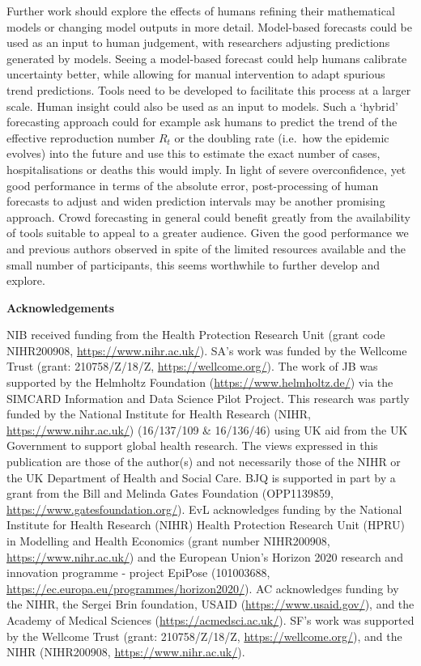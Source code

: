 \documentclass[
]{article}
\begin{document}
Further work should explore the effects of humans refining their mathematical models or changing model outputs in more detail. Model-based forecasts could be used as an input to human judgement, with researchers adjusting predictions generated by models. Seeing a model-based forecast could help humans calibrate uncertainty better, while allowing for manual intervention to adapt spurious trend predictions. Tools need to be developed to facilitate this process at a larger scale. Human insight could also be used as an input to models. Such a `hybrid' forecasting approach could for example ask humans to predict the trend of the effective reproduction number \(R_t\) or the doubling rate (i.e.~how the epidemic evolves) into the future and use this to estimate the exact number of cases, hospitalisations or deaths this would imply. In light of severe overconfidence, yet good performance in terms of the absolute error, post-processing of human forecasts to adjust and widen prediction intervals may be another promising approach. Crowd forecasting in general could benefit greatly from the availability of tools suitable to appeal to a greater audience. Given the good performance we and previous authors observed in spite of the limited resources available and the small number of participants, this seems worthwhile to further develop and explore.

\clearpage

\textbf{Acknowledgements}

NIB received funding from the Health Protection Research Unit (grant code NIHR200908, \url{https://www.nihr.ac.uk/}). SA's work was funded by the Wellcome Trust (grant: 210758/Z/18/Z, \url{https://wellcome.org/}). The work of JB was supported by the Helmholtz Foundation (\url{https://www.helmholtz.de/}) via the SIMCARD Information and Data Science Pilot Project. This research was partly funded by the National Institute for Health Research (NIHR, \url{https://www.nihr.ac.uk/}) (16/137/109 \& 16/136/46) using UK aid from the UK Government to support global health research. The views expressed in this publication are those of the author(s) and not necessarily those of the NIHR or the UK Department of Health and Social Care. BJQ is supported in part by a grant from the Bill and Melinda Gates Foundation (OPP1139859, \url{https://www.gatesfoundation.org/}). EvL acknowledges funding by the National Institute for Health Research (NIHR) Health Protection Research Unit (HPRU) in Modelling and Health Economics (grant number NIHR200908, \url{https://www.nihr.ac.uk/}) and the European Union's Horizon 2020 research and innovation programme - project EpiPose (101003688, \url{https://ec.europa.eu/programmes/horizon2020/}). AC acknowledges funding by the NIHR, the Sergei Brin foundation, USAID (\url{https://www.usaid.gov/}), and the Academy of Medical Sciences (\url{https://acmedsci.ac.uk/}). SF's work was supported by the Wellcome Trust (grant: 210758/Z/18/Z, \url{https://wellcome.org/}), and the NIHR (NIHR200908, \url{https://www.nihr.ac.uk/}).
\end{document}
